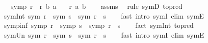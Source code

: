 \begin{isabellebody}
\ \ \ {\isachardoublequoteopen}symp\ r{\isachardoublequoteclose}\ \ {\isachardoublequoteopen}r\ b\ a{\isachardoublequoteclose}\isanewline
\ \ \ {\isachardoublequoteopen}r\ a\ b{\isachardoublequoteclose}\isanewline
%
\isadelimproof
\ \ %
\endisadelimproof
%
\isatagproof
{}\isamarkupfalse%
\ assms\ \isamarkupfalse%
\ {\isacharparenleft}{\kern0pt}rule\ symD\ {\isacharbrackleft}{\kern0pt}to{\isacharunderscore}{\kern0pt}pred{\isacharbrackright}{\kern0pt}{\isacharparenright}{\kern0pt}%
\endisatagproof
{\isafoldproof}%
%
\isadelimproof
\isanewline
%
\endisadelimproof
\isanewline
{}\isamarkupfalse%
\ sym{\isacharunderscore}{\kern0pt}Int{\isacharcolon}{\kern0pt}\ {\isachardoublequoteopen}sym\ r\ {\isasymLongrightarrow}\ sym\ s\ {\isasymLongrightarrow}\ sym\ {\isacharparenleft}{\kern0pt}r\ {\isasyminter}\ s{\isacharparenright}{\kern0pt}{\isachardoublequoteclose}\isanewline
%
\isadelimproof
\ \ %
\endisadelimproof
%
\isatagproof
{}\isamarkupfalse%
\ {\isacharparenleft}{\kern0pt}fast\ intro{\isacharcolon}{\kern0pt}\ symI\ elim{\isacharcolon}{\kern0pt}\ symE{\isacharparenright}{\kern0pt}%
\endisatagproof
{\isafoldproof}%
%
\isadelimproof
\isanewline
%
\endisadelimproof
\isanewline
{}\isamarkupfalse%
\ symp{\isacharunderscore}{\kern0pt}inf{\isacharcolon}{\kern0pt}\ {\isachardoublequoteopen}symp\ r\ {\isasymLongrightarrow}\ symp\ s\ {\isasymLongrightarrow}\ symp\ {\isacharparenleft}{\kern0pt}r\ {\isasymsqinter}\ s{\isacharparenright}{\kern0pt}{\isachardoublequoteclose}\isanewline
%
\isadelimproof
\ \ %
\endisadelimproof
%
\isatagproof
{}\isamarkupfalse%
\ {\isacharparenleft}{\kern0pt}fact\ sym{\isacharunderscore}{\kern0pt}Int\ {\isacharbrackleft}{\kern0pt}to{\isacharunderscore}{\kern0pt}pred{\isacharbrackright}{\kern0pt}{\isacharparenright}{\kern0pt}%
\endisatagproof
{\isafoldproof}%
%
\isadelimproof
\isanewline
%
\endisadelimproof
\isanewline
{}\isamarkupfalse%
\ sym{\isacharunderscore}{\kern0pt}Un{\isacharcolon}{\kern0pt}\ {\isachardoublequoteopen}sym\ r\ {\isasymLongrightarrow}\ sym\ s\ {\isasymLongrightarrow}\ sym\ {\isacharparenleft}{\kern0pt}r\ {\isasymunion}\ s{\isacharparenright}{\kern0pt}{\isachardoublequoteclose}\isanewline
%
\isadelimproof
\ \ %
\endisadelimproof
%
\isatagproof
{}\isamarkupfalse%
\ {\isacharparenleft}{\kern0pt}fast\ intro{\isacharcolon}{\kern0pt}\ symI\ elim{\isacharcolon}{\kern0pt}\ symE{\isacharparenright}{\kern0pt}%
\endisatagproof
{\isafoldproof}%
%
\isadelimproof
\isanewline

\end{isabellebody}
